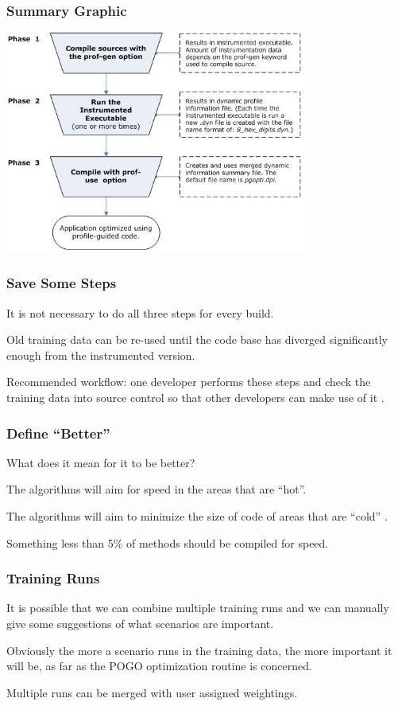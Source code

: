 \begin{frame}
\frametitle{Summary Graphic}

\begin{center}
	\includegraphics[width=0.75\textwidth]{images/pogo-workflow.jpg}
\end{center}

\end{frame}



\begin{frame}
\frametitle{Save Some Steps}

It is not necessary to do all three steps for every build. 

Old training data can be re-used until the code base has diverged significantly enough from the instrumented version. 

Recommended workflow: one developer performs these steps and check the training data into source control so that other developers can make use of it .

\end{frame}



\begin{frame}
\frametitle{Define ``Better''}

What does it mean for it to be better? 

The algorithms will aim for speed in the areas that are ``hot''. 

The algorithms will aim to minimize the size of code of areas that are ``cold'' .

Something less than 5\% of methods should be compiled for speed.

\end{frame}



\begin{frame}
\frametitle{Training Runs}

It is possible that we can combine multiple training runs and we can manually give some suggestions of what scenarios are important. 

Obviously the more a scenario runs in the training data, the more important it will be, as far as the POGO optimization routine is concerned. 

Multiple runs can be merged with user assigned weightings.

\end{frame}



